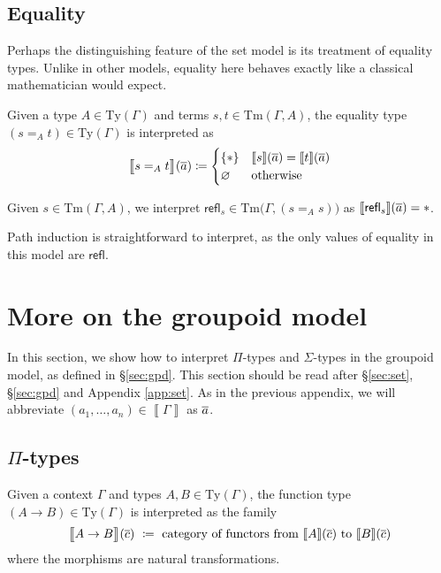 \documentclass{article}
\theoremstyle{definition}
\renewcommand{\int}[1]{\mathopen{}\left\llbracket #1
    \right\rrbracket\mathclose{}}       %
\newcommand{\refl}{\mathsf{refl}}
\newcommand{\Ty}{\mathrm{Ty}}
\newcommand{\Tm}{\mathrm{Tm}}
\newcommand{\defeq}{
	\mathrel{\mathrel{\mathop:}\mkern-1.2mu=}}	%
\newcommand{\tup}[1]{\overline{\smash{#1}\vphantom{a}}}
\newcommand{\n}{%
}                %
\begin{document}
\subsection{Equality}
\label{sec:set-eq}

Perhaps the distinguishing feature of the set model is its treatment of equality types. Unlike in other models, equality here behaves exactly like a classical mathematician would expect.

Given a type $A \in \Ty(\Gamma)$ and terms $s, t \in \Tm(\Gamma, A)$, the equality type $(s =_A t) \in \Ty(\Gamma)$ is interpreted as
$$\int{\big.s =_A t}\n(\tup{a}) \defeq \begin{cases}
    \{ * \} & \int{s}(\tup{a}) = \int{t}(\tup{a}) \\
    \varnothing & \text{otherwise}
\end{cases}$$

Given $s \in \Tm(\Gamma,A)$, we interpret $\refl_s \in \Tm\big(\Gamma, (s =_A s) \big)$ as $\int{\refl_s}(\tup{a}) = *$.

{\color{red}
Path induction is straightforward to interpret, as the only values of equality in this model are $\refl$.
}


\section{More on the groupoid model}
\label{app:gpd}

In this section, we show how to interpret $\Pi$-types and $\Sigma$-types in the groupoid model, as defined in \S\ref{sec:gpd}. This section should be read after \S\ref{sec:set}, \S\ref{sec:gpd} and Appendix \ref{app:set}. As in the previous appendix, we will abbreviate $(a_1,\ldots,a_n) \in \int{\Gamma}$ as $\tup{a}$.


\subsection{\texorpdfstring{$\Pi$}{Pi}-types}
\label{sec:gpd-pi}

Given a context $\Gamma$ and types $A, B \in \Ty(\Gamma)$, the function type $(A \to B) \in \Ty(\Gamma)$ is interpreted as the family
$$\int{\big.A \to B}(\tup{c})\ \defeq\ \text{category of functors from }\int{A}(\tup{c}) \text{ to } \int{B}(\tup{c})$$
where the morphisms are natural transformations.
\end{document}
